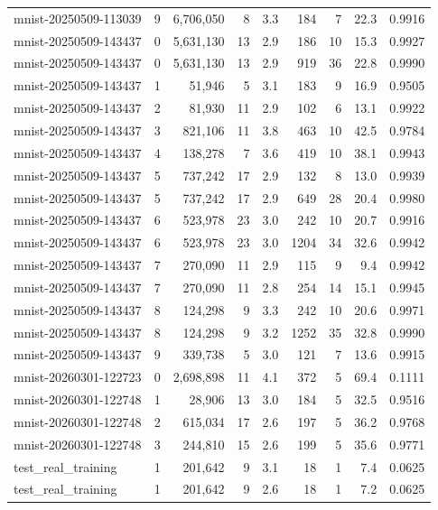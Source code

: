\begin{tabular}{llrrrrrrr}
mnist-20250509-113039 & 9 & 6,706,050 & 8 & 3.3 & 184 & 7 & 22.3 & 0.9916 \\
mnist-20250509-143437 & 0 & 5,631,130 & 13 & 2.9 & 186 & 10 & 15.3 & 0.9927 \\
mnist-20250509-143437 & 0 & 5,631,130 & 13 & 2.9 & 919 & 36 & 22.8 & 0.9990 \\
mnist-20250509-143437 & 1 & 51,946 & 5 & 3.1 & 183 & 9 & 16.9 & 0.9505 \\
mnist-20250509-143437 & 2 & 81,930 & 11 & 2.9 & 102 & 6 & 13.1 & 0.9922 \\
mnist-20250509-143437 & 3 & 821,106 & 11 & 3.8 & 463 & 10 & 42.5 & 0.9784 \\
mnist-20250509-143437 & 4 & 138,278 & 7 & 3.6 & 419 & 10 & 38.1 & 0.9943 \\
mnist-20250509-143437 & 5 & 737,242 & 17 & 2.9 & 132 & 8 & 13.0 & 0.9939 \\
mnist-20250509-143437 & 5 & 737,242 & 17 & 2.9 & 649 & 28 & 20.4 & 0.9980 \\
mnist-20250509-143437 & 6 & 523,978 & 23 & 3.0 & 242 & 10 & 20.7 & 0.9916 \\
mnist-20250509-143437 & 6 & 523,978 & 23 & 3.0 & 1204 & 34 & 32.6 & 0.9942 \\
mnist-20250509-143437 & 7 & 270,090 & 11 & 2.9 & 115 & 9 & 9.4 & 0.9942 \\
mnist-20250509-143437 & 7 & 270,090 & 11 & 2.8 & 254 & 14 & 15.1 & 0.9945 \\
mnist-20250509-143437 & 8 & 124,298 & 9 & 3.3 & 242 & 10 & 20.6 & 0.9971 \\
mnist-20250509-143437 & 8 & 124,298 & 9 & 3.2 & 1252 & 35 & 32.8 & 0.9990 \\
mnist-20250509-143437 & 9 & 339,738 & 5 & 3.0 & 121 & 7 & 13.6 & 0.9915 \\
mnist-20260301-122723 & 0 & 2,698,898 & 11 & 4.1 & 372 & 5 & 69.4 & 0.1111 \\
mnist-20260301-122748 & 1 & 28,906 & 13 & 3.0 & 184 & 5 & 32.5 & 0.9516 \\
mnist-20260301-122748 & 2 & 615,034 & 17 & 2.6 & 197 & 5 & 36.2 & 0.9768 \\
mnist-20260301-122748 & 3 & 244,810 & 15 & 2.6 & 199 & 5 & 35.6 & 0.9771 \\
test_real_training & 1 & 201,642 & 9 & 3.1 & 18 & 1 & 7.4 & 0.0625 \\
test_real_training & 1 & 201,642 & 9 & 2.6 & 18 & 1 & 7.2 & 0.0625 \\
\bottomrule
\end{tabular}